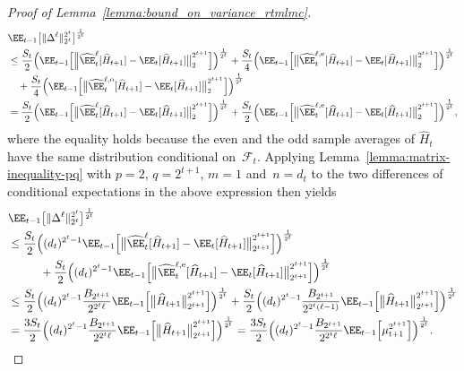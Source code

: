 \documentclass[11pt]{article}
\let\hat\widehat
\begin{document}
\begin{proof}[Proof of Lemma~\ref{lemma:bound_on_variance_rtmlmc}]
\begin{align*}
    &\EE_{t-1}\big[\|\Delta^\ell\|_{2^t}^{2^t}\big]^{\frac{1}{2^t}} \\
    & \leq \frac{S_t}{2}\Big(\EE_{t-1} \Big[\Big\|\hat\EE_t^\ell[\hat{H}_{t+1}] - \EE_t[\hat{H}_{t+1}] \big\|_2^{2^{t+1}}\Big]\Big)^{\frac{1}{2^t}} 
    + \frac{S_t}{4}\Big(\EE_{t-1} \Big[ \big\|\hat\EE_t^{\ell, {\rm e}}[\hat{H}_{t+1}] - \EE_t[\hat{H}_{t+1}]\big\|_2^{2^{t+1}}\Big]\Big)^{\frac{1}{2^t}} \\
    & \quad + \frac{S_t}{4}\Big(\EE_{t-1} \Big[ \big\|\hat\EE_t^{\ell, {\rm o}}[\hat{H}_{t+1}] - \EE_t[\hat{H}_{t+1}]\big\|_2^{2^{t+1}} \Big]\Big)^{\frac{1}{2^t}}\\
    & = \frac{S_t}{2}\Big(\EE_{t-1} \Big[\big\|\hat\EE_t^\ell[\hat{H}_{t+1}] - \EE_t[\hat{H}_{t+1}]\big\|_2^{2^{t+1}} \Big]\Big)^{\frac{1}{2^t}} + \frac{S_t}{2}\Big(\EE_{t-1} \Big[ \big\|\hat\EE_t^{\ell, {\rm e}}[\hat{H}_{t+1}] - \EE_t[\hat{H}_{t+1}]\big\|_2^{2^{t+1}}\Big]\Big)^{\frac{1}{2^t}},
\end{align*}
where the equality holds because the even and the odd sample averages of $\hat H_t$ have the same distribution conditional on~$\mathcal F_t$. Applying Lemma~\ref{lemma:matrix-inequality-pq} with $p=2$, $q=2^{t+1}$, $m=1$ and~$n=d_t$ to the two differences of conditional expectations in the above expression then yields 
\begin{align*}
    & \EE_{t-1}\big[\|\Delta^\ell \|_{2^t}^{2^t}\big]^{\frac{1}{2^t}} \\
    &\leq \frac{S_t}{2}\Big((d_t)^{2^t-1}\EE_{t-1} \Big[\big\|\hat\EE_t^\ell[\hat{H}_{t+1}] - \EE_t[\hat{H}_{t+1}]\big\|_{2^{t+1}}^{2^{t+1}} \Big]\Big)^{\frac{1}{2^t}} \\
    & \hspace{1cm} + \frac{S_t}{2}\Big((d_t)^{2^t-1}\EE_{t-1} \Big[ \big\|\hat\EE_t^{\ell, {\rm e}}[\hat{H}_{t+1}] - \EE_t[\hat{H}_{t+1}]\big\|_{2^{t+1}}^{2^{t+1}}\Big]\Big)^{\frac{1}{2^t}}\\
    &\leq \frac{S_t}{2}\Big((d_t)^{2^t-1}\frac{B_{2^{t+1}}}{2^{2^{t}\ell}}\EE_{t-1}\Big[\big\|  \hat{H}_{t+1}\big\|_{2^{t+1}}^{2^{t+1}}\Big] \Big)^{\frac{1}{2^t}} + \frac{S_t}{2}\Big((d_t)^{2^t-1}\frac{B_{2^{t+1}}}{2^{2^t(\ell-1)}}\EE_{t-1}\Big[\big\|  \hat{H}_{t+1}\big\|_{2^{t+1}}^{2^{t+1}}\Big]\Big)^{\frac{1}{2^t}} \\
    &= \frac{3S_t}{2}\Big((d_t)^{2^t-1}\frac{B_{2^{t+1}}}{2^{2^t\ell}}\EE_{t-1}\Big[\big\|  \hat{H}_{t+1}\big\|_{2^{t+1}}^{2^{t+1}}\Big]\Big)^{\frac{1}{2^t}}= \frac{3S_t}{2}\Big((d_t)^{2^t-1}\frac{B_{2^{t+1}}}{2^{2^t\ell}}\EE_{t-1}\Big[ \mu_{t+1}^{2^{t+1}}\Big]\Big)^{\frac{1}{2^t}}.

\end{align*}
\end{proof}
\end{document}
